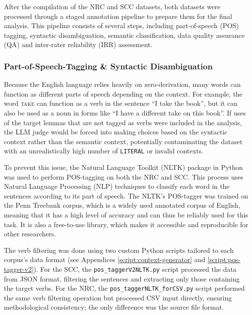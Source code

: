 \documentclass[11pt,a4paper]{article}
\begin{document}
After the compilation of the NRC and SCC datasets, both datasets were processed through a staged annotation pipeline to prepare them for the final analysis. This pipeline consists of several steps, including part-of-speech (POS) tagging, syntactic disambiguation, semantic classification, data quality assurance (QA) and inter-rater reliability (IRR) assessment. 

\subsubsection{Part-of-Speech-Tagging \& Syntactic Disambiguation}\label{subsubsec:pos-tagging}

Because the English language relies heavily on zero-derivation, many words can function as different parts of speech depending on the context. For example, the word \textsc{take} can function as a verb in the sentence ``I take the book'', but it can also be used as a noun in forms like ``I have a different take on this book''. If uses of the target lemmas that are not tagged as verbs were included in the analysis, the LLM judge would be forced into making choices based on the syntactic context rather than the semantic context, potentially contaminating the dataset with an unrealistically high number of \texttt{LITERAL} or invalid contexts. 

To prevent this issue, the Natural Language Toolkit (NLTK) \parencite{birdKleinLoperNLP2009,loperBirdNLTK2002} package in Python was used to perform POS-tagging on both the NRC and SCC. This process uses Natural Language Processing (NLP) techniques to classify each word in the sentences according to its part of speech. The NLTK's POS-tagger was trained on the Penn Treebank corpus, which is a widely used annotated corpus of English, meaning that it has a high level of accuracy and can thus be reliably used for this task. It is also a free-to-use library, which makes it accessible and reproducible for other researchers. 

The verb filtering was done using two custom Python scripts tailored to each corpus's data format (see Appendices \ref{script:context-generator} and \ref{script:pos-tagger-v2}). For the SCC, the \texttt{pos\_taggerV2NLTK.py} script processed the data from JSON format, filtering the sentences and extracting only those containing the target verbs. For the NRC, the \texttt{pos\_taggerNLTK\_forCSV.py} script performed the same verb filtering operation but processed CSV input directly, ensuring methodological consistency; the only difference was the source file format.
\end{document}
